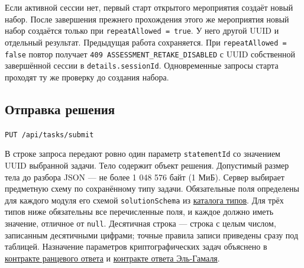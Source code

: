 \documentclass[12pt,a4paper]{article}
\begin{document}
Если активной сессии нет, первый старт открытого мероприятия создаёт новый набор. После завершения прежнего прохождения этого же мероприятия новый набор создаётся только при \texttt{repeat\allowbreak{}Allowed =\allowbreak{} true}. У него другой UUID и отдельный результат. Предыдущая работа сохраняется. При \texttt{repeat\allowbreak{}Allowed =\allowbreak{} false} повтор получает \texttt{409 ASSESSMENT\_\allowbreak{}RETAKE\_\allowbreak{}DISABLED} с UUID собственной завершённой сессии в \texttt{details.\allowbreak{}session\allowbreak{}Id}. Одновременные запросы старта проходят ту же проверку до создания набора.

\subsection{Отправка решения}\label{2-ux43eux442ux43fux440ux430ux432ux43aux430-ux440ux435ux448ux435ux43dux438ux44f}

\hypertarget{2-отправка-решения}{}

\texttt{PUT /\allowbreak{}api/\allowbreak{}tasks/\allowbreak{}submit}

В строке запроса передают ровно один параметр \texttt{statement\allowbreak{}Id} со значением UUID выбранной задачи. Тело содержит объект решения. Допустимый размер тела до разбора JSON --- не более 1 048 576 байт (1 МиБ). Сервер выбирает предметную схему по сохранённому типу задачи. Обязательные поля определены для каждого модуля его схемой \texttt{solution\allowbreak{}Schema} из {\hyperlink{каталог-типов-и-банк-преподавателя}{каталога типов}}. Для трёх типов ниже обязательны все перечисленные поля, и каждое должно иметь значение, отличное от \texttt{null}. Десятичная строка --- строка с целым числом, записанным десятичными цифрами; точные правила записи приведены сразу под таблицей. Назначение параметров криптографических задач объяснено в {\href{../07\_Программные\_требования/DOC-06.2\_Сессии\_задач\_и\_планировщик.pdf\#ранцевая-задача}{контракте ранцевого ответа}} и {\href{../07\_Программные\_требования/DOC-06.2\_Сессии\_задач\_и\_планировщик.pdf\#эль-гамаль}{контракте ответа Эль-Гамаля}}.
\end{document}
